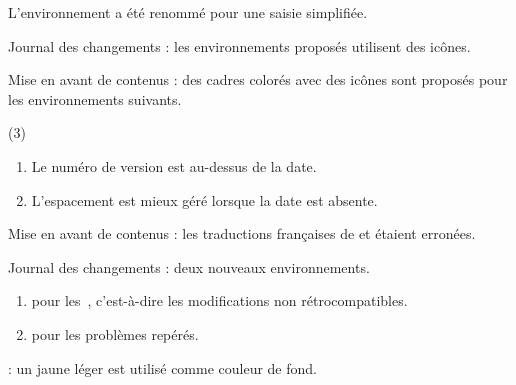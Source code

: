 \begin{tdocbreak}
    \item L'environnement  a été renommé  pour une saisie simplifiée.
\end{tdocbreak}


\begin{tdocnew}
    \item Journal des changements : les environnements proposés utilisent des icônes.


    \item Mise en avant de contenus : des cadres colorés avec des icônes sont proposés pour les environnements suivants.
    \begin{tasks}[label=\arabic*.](3)
        \task {}
        \task {}
        \task {}
        \task {}
        \task {}
    \end{tasks}
\end{tdocnew}

\tdocsep




\begin{tdocupdate}[version = 1.2.0-a, date = 2024-08-23]
    \item {}
    \begin{enumerate}
        \item Le numéro de version est au-dessus de la date.

        \item L'espacement est mieux géré lorsque la date est absente.
    \end{enumerate}
\end{tdocupdate}


\begin{tdocfix}
    \item Mise en avant de contenus : les traductions françaises de  et  étaient erronées.
\end{tdocfix}

\tdocsep




\begin{tdocnew}[version = 1.1.0, date = 2024-01-06]
    \item Journal des changements : deux nouveaux environnements.
    \begin{enumerate}
        \item {} pour les \,, c'est-à-dire les modifications non rétrocompatibles.

        \item {} pour les problèmes repérés.
    \end{enumerate}

    \item {}: un jaune léger est utilisé comme couleur de fond.
\end{tdocnew}

